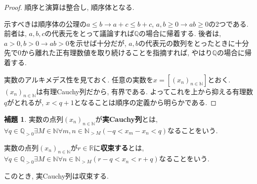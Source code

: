\documentclass[a4paper, twoside]{bxjsarticle}
\newcommand{\nat}{\mathbb{N}}
\newcommand{\quo}{\mathbb{Q}}
\newcommand{\rea}{\mathbb{R}}
\theoremstyle{definition}
\newtheorem{lem}[thm]{補題}
\begin{document}
\begin{proof}
            順序と演算は整合し, 順序体となる.
            \begin{framed}
                示すべきは順序体の公理の$a\leq b\to a+c\leq b+c$, $a, b\geq 0 \to ab\geq 0$の2つである. 前者は, $a, b, c$の代表元をとって議論すれば$\quo$の場合に帰着する. 後者は, $a>0, b>0\to ab>0$を示せば十分だが, $a, b$の代表元の数列をとったときに十分先で0から離れた正有理数値を取り続けることを指摘すれば, やはり$\quo$の場合に帰着する.
            \end{framed}
            
            実数のアルキメデス性を見ておく. 任意の実数を$x=[(x_n)_{n\in\nat}]$とおく. $(x_n)_{n\in\nat}$は有理Cauchy列だから, 有界である. よってこれを上から抑える有理数$q$がとれるが, $x<q+1$となることは順序の定義から明らかである. 
        \end{proof}
        \begin{lem}\label{cauchy}
            実数の点列$(x_n)_{n\in\nat}$が\textbf{実Cauchy列}とは, $\forall q\in\quo_{>0} \exists M\in\nat \forall m, n\in \nat_{>M} (-q<x_m-x_n<q)$なることをいう.
            
            実数の点列$(x_n)_{n\in\nat}$が$r\in\rea$に\textbf{収束する}とは, $\forall q\in\quo_{>0} \exists M\in\nat \forall n\in\nat_{>M} (r-q<x_n<r+q)$なることをいう.
            
            このとき, 実Cauchy列は収束する.
        \end{lem}
\end{document}
